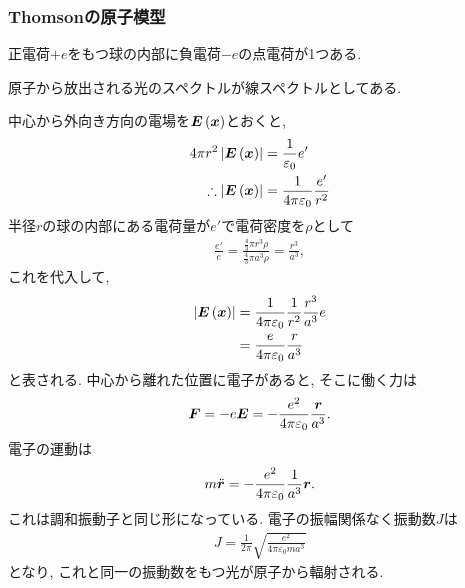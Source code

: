 \documentclass[10pt,a4paper]{jsarticle}
\begin{document}
\subsubsection{Thomsonの原子模型}
正電荷$+e$をもつ球の内部に負電荷$-e$の点電荷が1つある. \par
原子から放出される光のスペクトルが線スペクトルとしてある. \par
中心から外向き方向の電場を$\bm{E} \left( \bm{x} \right)$とおくと, 
\begin{align*}
    4\pi r^2 \left| \bm{E} \left( \bm{x} \right) \right| &= \frac{1}{\varepsilon_0} e'\\
    \therefore \left| \bm{E} \left( \bm{x} \right) \right| &= \frac{1}{4\pi \varepsilon_0} \frac{e'}{r^2}
\end{align*}
半径$r$の球の内部にある電荷量が$e'$で電荷密度を$\rho $として
\begin{align*}
    \frac{e'}{e} = \frac{\frac{4}{3} \pi r^3 \rho}{\frac{4}{3} \pi a^3 \rho} = \frac{r^3}{a^3} ,
\end{align*}
これを代入して, 
\begin{align*}
    \left| \bm{E} \left( \bm{x} \right) \right| &= \frac{1}{4\pi \varepsilon_0 } \frac{1}{r^2} \frac{r^3}{a^3} e \\
    &= \frac{e}{4\pi \varepsilon_0 } \frac{r}{a^3}
\end{align*}
と表される. 中心から離れた位置に電子があると, そこに働く力は
\begin{align*}
    \bm{F} = - e \bm{E} = - \frac{e^2}{4\pi \varepsilon_0} \frac{\bm{r}}{a^3}. 
\end{align*}
電子の運動は
\begin{align*}
    m\ddot{\bm{r}} = - \frac{e^2}{4\pi \varepsilon_0 } \frac{1}{a^3} \bm{r}.
\end{align*}
これは調和振動子と同じ形になっている. 電子の振幅関係なく振動数$J$は
\begin{align*}
    J = \frac{1}{2\pi } \sqrt{\frac{e^2}{4\pi \varepsilon_0 ma^3}}
\end{align*}
となり, これと同一の振動数をもつ光が原子から輻射される. 
\end{document}
